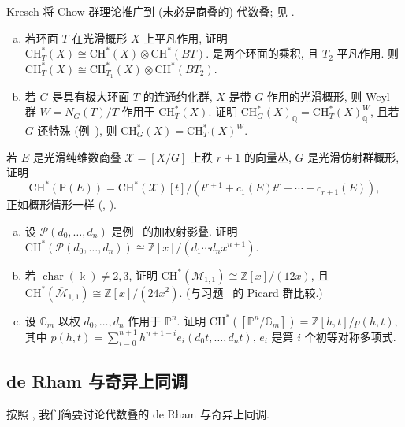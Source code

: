 Kresch 将 Chow 群理论推广到 (未必是商叠的) 代数叠; 见 \cite{Kre99}.
\begin{exercise}[困难]\label{src:7.1.38}
\begin{enumerate}[(a)]
\item 若环面 $T$ 在光滑概形 $X$ 上平凡作用, 证明 $\mathrm{CH}_T^*(X)\cong\mathrm{CH}^*(X)\otimes\mathrm{CH}^*(BT)$. 是两个环面的乘积, 且 $T_2$ 平凡作用. 则 $\mathrm{CH}_T^*(X)\cong\mathrm{CH}_{T_1}^*(X)\otimes\mathrm{CH}^*(BT_2)$.
\item 若 $G$ 是具有极大环面 $T$ 的连通约化群, $X$ 是带 $G$-作用的光滑概形, 则 Weyl 群 $W=N_G(T)/T$ 作用于 $\mathrm{CH}_T^*(X)$. 证明 $\mathrm{CH}_G^*(X)_{\mathbb Q}=\mathrm{CH}_T^*(X)_{\mathbb Q}^W$, 且若 $G$ 还特殊 (例~), 则 $\mathrm{CH}_G^*(X)=\mathrm{CH}_T^*(X)^W$.
\end{enumerate}
\end{exercise}
\begin{exercise}[射影丛公式]\label{src:7.1.39}
若 $E$ 是光滑纯维数商叠 $\mathcal X=[X/G]$ 上秩 $r+1$ 的向量丛, $G$ 是光滑仿射群概形, 证明
\[
\mathrm{CH}^*(\mathbb P(E))=\mathrm{CH}^*(\mathcal X)[t]/(t^{r+1}+c_1(E)t^r+\cdots+c_{r+1}(E)),
\]
正如概形情形一样 (\cite[定理 3.3]{Ful98}, \cite[定理 9.6]{EH16}).
\end{exercise}
\begin{exercise}[中等]\label{src:7.1.40}
\begin{enumerate}[(a)]
\item 设 $\mathcal P(d_0,\ldots,d_n)$ 是例~ 的加权射影叠. 证明 $\mathrm{CH}^*(\mathcal P(d_0,\ldots,d_n))\cong\mathbb Z[x]/(d_1\cdots d_nx^{n+1})$.
\item 若 $\operatorname{char}(\Bbbk)\neq2,3$, 证明 $\mathrm{CH}^*(\mathcal M_{1,1})\cong\mathbb Z[x]/(12x)$, 且 $\mathrm{CH}^*(\overline{\mathcal M}_{1,1})\cong\mathbb Z[x]/(24x^2)$. (与习题~ 的 Picard 群比较.)
\item 设 $\mathbb G_m$ 以权 $d_0,\ldots,d_n$ 作用于 $\mathbb P^n$. 证明 $\mathrm{CH}^*([\mathbb P^n/\mathbb G_m])=\mathbb Z[h,t]/p(h,t)$, 其中 $p(h,t)=\sum_{i=0}^{n+1}h^{n+1-i}e_i(d_0t,\ldots,d_nt)$, $e_i$ 是第 $i$ 个初等对称多项式.
\end{enumerate}
\end{exercise}
\subsection{de Rham 与奇异上同调}\label{src:7.1.7-subsection}
按照 \cite{Beh04}, 我们简要讨论代数叠的 de Rham 与奇异上同调.
